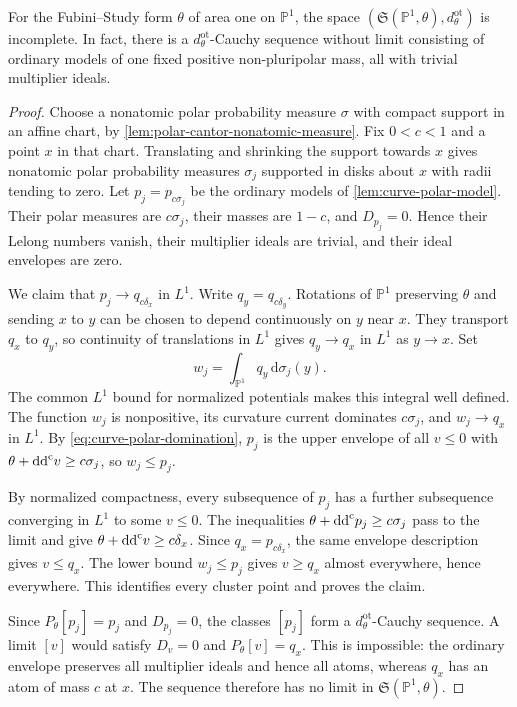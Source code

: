 \begin{proposition}\label{prop:curve-ordinary-topology-incomplete}
For the Fubini--Study form $\theta$ of area one on $\mathbb P^1$, the space $(\mathfrak S(\mathbb P^1,\theta),d^{\mathrm{ot}}_\theta)$ is incomplete. In fact, there is a $d^{\mathrm{ot}}_\theta$-Cauchy sequence without limit consisting of ordinary models of one fixed positive non-pluripolar mass, all with trivial multiplier ideals.
\end{proposition}
\begin{proof}
Choose a nonatomic polar probability measure $\sigma$ with compact support in an affine chart, by \cref{lem:polar-cantor-nonatomic-measure}. Fix $0<c<1$ and a point $x$ in that chart. Translating and shrinking the support towards $x$ gives nonatomic polar probability measures $\sigma_j$ supported in disks about $x$ with radii tending to zero. Let $p_j=p_{c\sigma_j}$ be the ordinary models of \cref{lem:curve-polar-model}. Their polar measures are $c\sigma_j$, their masses are $1-c$, and $D_{p_j}=0$. Hence their Lelong numbers vanish, their multiplier ideals are trivial, and their ideal envelopes are zero.

We claim that $p_j\to q_{c\delta_x}$ in $L^1$. Write $q_y=q_{c\delta_y}$. Rotations of $\mathbb P^1$ preserving $\theta$ and sending $x$ to $y$ can be chosen to depend continuously on $y$ near $x$. They transport $q_x$ to $q_y$, so continuity of translations in $L^1$ gives $q_y\to q_x$ in $L^1$ as $y\to x$. Set
\[
 w_j=\int_{\mathbb P^1}q_y\,\mathrm d\sigma_j(y).
\]
The common $L^1$ bound for normalized potentials makes this integral well defined. The function $w_j$ is nonpositive, its curvature current dominates $c\sigma_j$, and $w_j\to q_x$ in $L^1$. By \eqref{eq:curve-polar-domination}, $p_j$ is the upper envelope of all $v\leq0$ with $\theta+\mathrm{dd}^{\mathrm{c}} v\geq c\sigma_j$, so $w_j\leq p_j$.

By normalized compactness, every subsequence of $p_j$ has a further subsequence converging in $L^1$ to some $v\leq0$. The inequalities $\theta+\mathrm{dd}^{\mathrm{c}} p_j\geq c\sigma_j$ pass to the limit and give $\theta+\mathrm{dd}^{\mathrm{c}} v\geq c\delta_x$. Since $q_x=p_{c\delta_x}$, the same envelope description gives $v\leq q_x$. The lower bound $w_j\leq p_j$ gives $v\geq q_x$ almost everywhere, hence everywhere. This identifies every cluster point and proves the claim.

Since $P_\theta[p_j]=p_j$ and $D_{p_j}=0$, the classes $[p_j]$ form a $d^{\mathrm{ot}}_\theta$-Cauchy sequence. A limit $[v]$ would satisfy $D_v=0$ and $P_\theta[v]=q_x$. This is impossible: the ordinary envelope preserves all multiplier ideals and hence all atoms, whereas $q_x$ has an atom of mass $c$ at $x$. The sequence therefore has no limit in $\mathfrak S(\mathbb P^1,\theta)$.
\end{proof}

